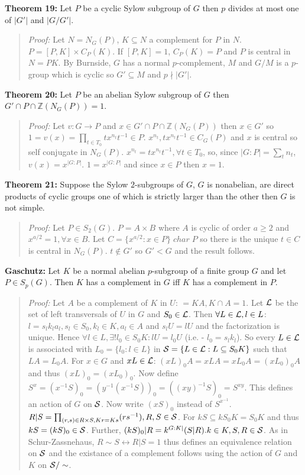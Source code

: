 {\bf Theorem 19:}
Let $P$ be a cyclic Sylow subgroup of $G$ then $p$ divides at most one of $|G'|$ and $|G/G'|$.
\begin{quote}
\emph{Proof:}  
Let $N=N_G(P)$, $K \subseteq N$ a complement for $P$ in $N$.  $P= [P,K] \times C_P(K)$.
If $[P, K]=1$, $C_P(K)=P$ and $P$ is central in $N=PK$.  By Burnside,
$G$ has a normal $p$-complement, $M$ and $G/M$ is a $p$-group which is cyclic so
$G' \subseteq M$ and $p \nmid |G'|$.
\end{quote}
{\bf Theorem 20:}
Let $P$ be an abelian Sylow subgroup of $G$ then $G' \cap P \cap {\mathbb Z}(N_G(P))=1$.
\begin{quote}
\emph{Proof:}  
Let $v:G \rightarrow P$ and $x \in G' \cap P \cap {\mathbb Z}(N_G(P))$ then $x \in G'$ so
$1=v(x)=\prod_{t \in T_0} t x^{n_t} t^{-1} \in P$.  $x^{n_t} , t x^{n_t} t^{-1} \in C_G(P)$ and
$x$ is central so self conjugate in $N_G(P)$.  $x^{n_t}= t x^{n_t} t^{-1}, \forall t \in T_0$,
so, since $|G:P|= \sum_t n_t$, $v(x)= x^{|G:P|}$.  $1= x^{|G:P|}$ and since $x \in P$ then
$x=1$.
\end{quote}
{\bf Theorem 21:}
Suppose the Sylow $2$-subgroups of $G$, $G$ is nonabelian, are direct products of cyclic groups
one of which is strictly larger than the other then $G$ is not simple.
\begin{quote}
\emph{Proof:}  
Let $P \in S_2(G)$.  $P= A \times B$ where $A$ is cyclic of order $a \ge 2$ and
$x^{a/2}=1, \forall x \in B$.  Let $C= \{ x^{a/2}: x \in P \} \; char \; P$ so there is
the unique $t \in C$ is central in $N_G(P)$.  $t \notin G'$ so $G' < G$ and the result follows.
\end{quote}
{\bf Gaschutz:}  Let $K$ be a normal abelian $p$-subgroup of a finite group $G$ and let
$P \in S_p(G)$.  Then $K$ has a complement in $G$ iff $K$ has a complement in $P$.
\begin{quote}
\emph{Proof:}  
Let $A$ be a complement of $K$ in $U$: $=KA, K \cap A = 1$.  
Let ${\cal L}$ be the set of left transversals of $U$ in $G$ and $S_0 \in {\cal L}$.
Then $\forall L \in {\cal L}, l \in L$:
$l=s_l k_l a_l, s_l \in S_0, k_l \in K, a_l \in A$ and $s_l U = lU$ and the factorization is
unique.  Hence
$\forall l \in L, \exists! l_0 \in S_0 K: lU=l_0 U$ (i.e. - $l_0=s_l k_l$).  So every
$L \in {\cal L}$ is associated with $L_0 = \{ l_0 : l \in L \}$ in
${\cal S} = \{ L \in {\cal L}: L \subseteq S_0 K \}$ such that $LA= L_0 A$.  For $x \in G$ and
$xL \in {\cal L}$: $(xL)_0A = xLA = x L_0 A = (xL_0)_0 A$ and thus $(xL)_0 = (x L_0)_0$.
Now define $S^x= (x^{-1} S)_0 = (y^{-1} ( x^{-1} S))_0 = ((xy)^{-1} S)_0 = S^{xy}$.
This defines an action of $G$ on ${\cal S}$.  Now write $(xS)_0$ instead of $S^{x^{-1}}$.
$R|S= \prod_{(r,s) \in R \times S, Kr=Ks} (rs^{-1}), R, S \in {\cal S}$.  For
$kS \subseteq k S_0 K= S_0 K$ and thus $kS = (kS)_0 \in {\cal S}$.  Further,
$(kS)_0|R = k^{G:K|} (S|R). k \in K, S,R \in {\cal S}$.  As in Schur-Zassnehaus,
$R \sim S  \leftrightarrow R|S=1$ thus defines an equivalence relation on ${\cal S}$
and the existance of a complement follows using the action of $G$ and $K$ on ${\cal S}/ \sim$.
\end{quote}
